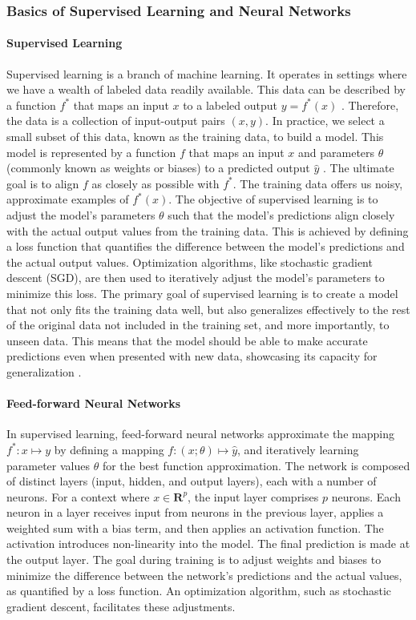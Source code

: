 \subsubsection{Basics of Supervised Learning and Neural Networks}
\paragraph{Supervised Learning}
Supervised learning is a branch of machine learning. It operates in settings where we have a wealth of labeled data readily available. This data can be described by a function $f^*$ that maps an input $x$ to a labeled output $y=f^*(x)$ \cite{bishop2006}. Therefore, the data is a collection of input-output pairs $(x, y)$. In practice, we select a small subset of this data, known as the training data, to build a model. This model is represented by a function $f$ that maps an input $x$ and parameters $\theta$ (commonly known as weights or biases) to a predicted output $\hat{y}$ \cite{Goodfellow-et-al-2016}. The ultimate goal is to align $f$ as closely as possible with $f^*.$ The training data offers us noisy, approximate examples of $f^*(x).$ The objective of supervised learning is to adjust the model's parameters $\theta$ such that the model's predictions align closely with the actual output values from the training data. This is achieved by defining a loss function that quantifies the difference between the model's predictions and the actual output values. Optimization algorithms, like stochastic gradient descent (SGD), are then used to iteratively adjust the model's parameters to minimize this loss. The primary goal of supervised learning is to create a model that not only fits the training data well, but also generalizes effectively to the rest of the original data not included in the training set, and more importantly, to unseen data. This means that the model should be able to make accurate predictions even when presented with new data, showcasing its capacity for generalization \cite{james2013}.
\paragraph{Feed-forward Neural Networks}
In supervised learning, feed-forward neural networks approximate the mapping $f^*: x \mapsto y$ by defining a mapping $f: (x;\theta) \mapsto \hat{y}$, and iteratively learning parameter values $\theta$ for the best function approximation. The network is composed of distinct layers (input, hidden, and output layers), each with a number of neurons. For a context where $x \in \mathbf{R}^{p}$, the input layer comprises $p$ neurons. Each neuron in a layer receives input from neurons in the previous layer, applies a weighted sum with a bias term, and then applies an activation function. The activation introduces non-linearity into the model. The final prediction is made at the output layer. The goal during training is to adjust weights and biases to minimize the difference between the network's predictions and the actual values, as quantified by a loss function. An optimization algorithm, such as stochastic gradient descent, facilitates these adjustments.

